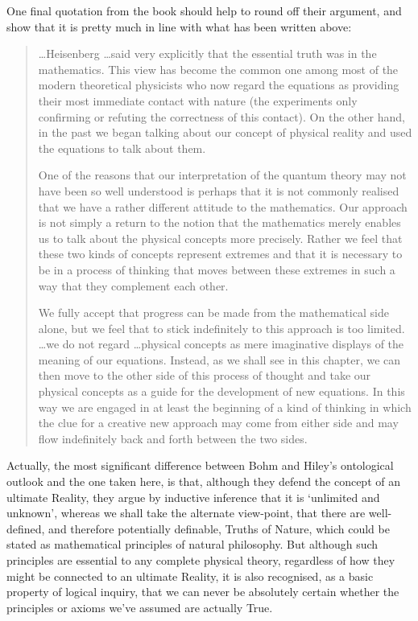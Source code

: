 One final quotation from the book should help to round off their argument, and show that it is pretty much in line with what has been written above:
\begin{quotation}
\ldots Heisenberg \ldots said very explicitly that the essential truth was in the mathematics. This view has become the common one among most of the modern theoretical physicists who now regard the equations as providing their most immediate contact with nature (the experiments only confirming or refuting the correctness of this contact). On the other hand, in the past we began talking about our concept of physical reality and used the equations to talk about them.

One of the reasons that our interpretation of the quantum theory may not have been so well understood is perhaps that it is not commonly realised that we have a rather different attitude to the mathematics. Our approach is not simply a return to the notion that the mathematics merely enables us to talk about the physical concepts more precisely. Rather we feel that these two kinds of concepts represent extremes and that it is necessary to be in a process of thinking that moves between these extremes in such a way that they complement each other.

We fully accept that progress can be made from the mathematical side alone, but we feel that to stick indefinitely to this approach is too limited. \ldots we do not regard \ldots physical concepts as mere imaginative displays of the meaning of our equations. Instead, as we shall see in this chapter, we can then move to the other side of this process of thought and take our physical concepts as a guide for the development of new equations. In this way we are engaged in at least the beginning of a kind of thinking in which the clue for a creative new approach may come from either side and may flow indefinitely back and forth between the two sides.
\end{quotation}

Actually, the most significant difference between Bohm and Hiley's ontological outlook and the one taken here, is that, although they defend the concept of an ultimate Reality, they argue by inductive inference that it is `unlimited and unknown', whereas we shall take the alternate view-point, that there are well-defined, and therefore potentially definable, Truths of Nature, which could be stated as mathematical principles of natural philosophy. But although such principles are essential to any complete physical theory, regardless of how they might be connected to an ultimate Reality, it is also recognised, as a basic property of logical inquiry, that we can never be absolutely certain whether the principles or axioms we've assumed are actually True.

